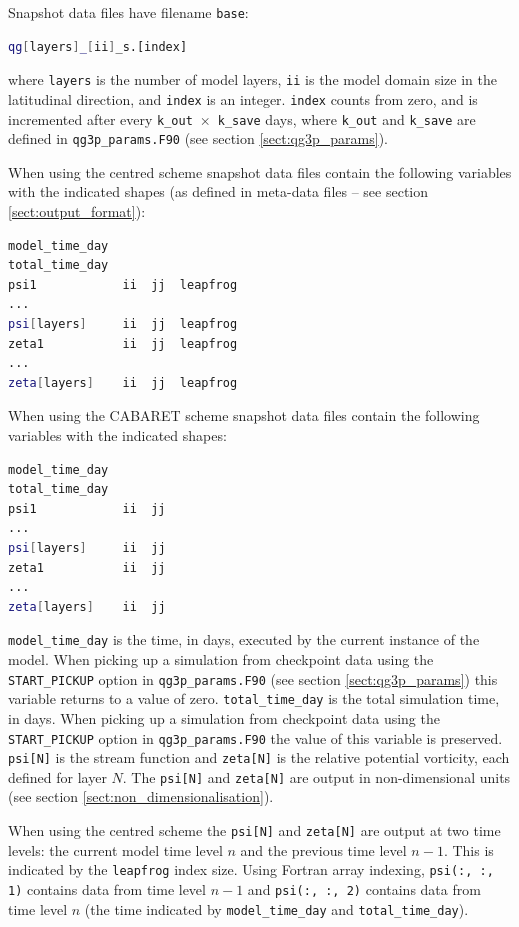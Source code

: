 \documentclass[a4paper]{book}
\begin{document}
Snapshot data files have filename \verb+base+:
\begin{lstlisting}[language = bash, frame = single]
qg[layers]_[ii]_s.[index]
\end{lstlisting}
where \verb+layers+ is the number of model layers, \verb+ii+ is the model
domain size in the latitudinal direction, and \verb+index+ is an integer.
\verb+index+ counts from zero, and is incremented after every
\verb+k_out+~$\times$~\verb+k_save+ days, where \verb+k_out+ and \verb+k_save+
are defined in \verb+qg3p_params.F90+ (see section \ref{sect:qg3p_params}).

When using the centred scheme snapshot data files contain the following
variables with the indicated shapes (as defined in meta-data files -- see
section \ref{sect:output_format}):
\begin{lstlisting}[language = bash, frame = single]
model_time_day
total_time_day
psi1            ii  jj  leapfrog
...
psi[layers]     ii  jj  leapfrog
zeta1           ii  jj  leapfrog
...
zeta[layers]    ii  jj  leapfrog
\end{lstlisting}
When using the CABARET scheme snapshot data files contain the following
variables with the indicated shapes:
\begin{lstlisting}[language = bash, frame = single]
model_time_day
total_time_day
psi1            ii  jj
...
psi[layers]     ii  jj
zeta1           ii  jj
...
zeta[layers]    ii  jj
\end{lstlisting}

\verb+model_time_day+ is the time, in days, executed by the current instance of
the model. When picking up a simulation from checkpoint data using the
\verb+START_PICKUP+ option in \verb+qg3p_params.F90+ (see section
\ref{sect:qg3p_params}) this variable returns to a value of zero.
\verb+total_time_day+ is the total simulation time, in days. When picking up a
simulation from checkpoint data using the \verb+START_PICKUP+ option in
\verb+qg3p_params.F90+ the value of this variable is preserved. \verb+psi[N]+ is
the stream function and \verb+zeta[N]+ is the relative potential vorticity,
each defined for layer $N$. The \verb+psi[N]+ and \verb+zeta[N]+ are output in
non-dimensional units (see section \ref{sect:non_dimensionalisation}).

When using the centred scheme the \verb+psi[N]+ and \verb+zeta[N]+ are output
at two time levels: the current model time level $n$ and the previous time
level $n - 1$. This is indicated by the \verb+leapfrog+ index size. Using
Fortran array indexing, \verb+psi(:, :, 1)+ contains data from time level
$n - 1$ and \verb+psi(:, :, 2)+ contains data from time level $n$ (the time
indicated by \verb+model_time_day+ and \verb+total_time_day+).
\end{document}
